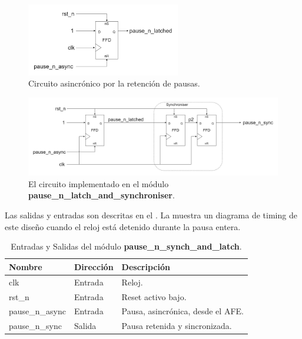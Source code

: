 \documentclass[a4paper, twoside, 11pt]{report}
\begin{document}
\begin{figure}[htb]
  \centering
  \includegraphics[width=0.6\textwidth]{./img/pause_latch_and_synch1_latching.drawio}
  \caption{Circuito asincrónico por la retención de pausas.}
  \label{fig:pause_n_latch}
\end{figure}

\begin{figure}[htb]
  \centering
  \includegraphics[width=1.0\textwidth]{./img/pause_latch_and_synch1_ffd.drawio}
  \caption{\small{El circuito implementado en el módulo \textbf{pause\_n\_latch\_and\_synchroniser}.}}
  \label{fig:pause_n_synch_and_latch}
\end{figure}

\FloatBarrier

Las salidas y entradas son descritas en el . La  muestra un diagrama de timing de este diseño cuando el reloj está detenido durante la pausa entera.

\begin{table}[htb]
  \centering
  \tablezebra
  \begin{tabulary}{\linewidth}{l|l|L}
    \textbf{Nombre}&\textbf{Dirección}&\textbf{Descripción} \\
    \hline
    clk&Entrada&Reloj. \\
    rst\_n&Entrada&Reset activo bajo. \\
    pause\_n\_async&Entrada&Pausa, asincrónica, desde el AFE. \\
    pause\_n\_sync&Salida &Pausa retenida y sincronizada. \\
  \end{tabulary}
  \caption{Entradas y Salidas del módulo \textbf{pause\_n\_synch\_and\_latch}.}
  \label{tab:ports_pause_n_synch_and_latch}
\end{table}
\end{document}
